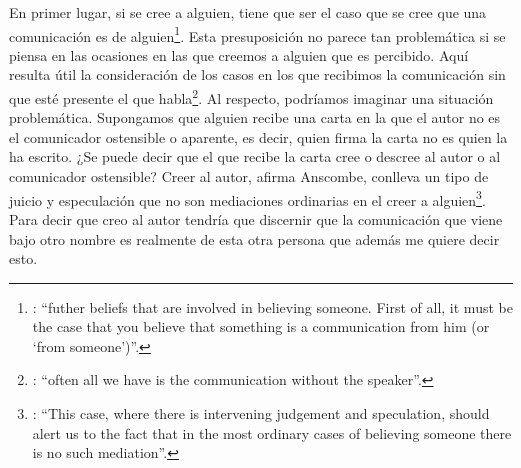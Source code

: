 En primer lugar, si se cree a alguien, tiene que ser el caso que se cree que una comunicación es de alguien\footnote{\cite[Cf.][6]{anscombe2008faith:tobelieve}: \enquote{futher beliefs that are involved in believing someone. First of all, it must be the case that you believe that something is a communication from him (or `from someone')}.}. Esta presuposición no parece tan problemática si se piensa en las ocasiones en las que creemos a alguien que es percibido. Aquí resulta útil la consideración de los casos en los que recibimos la comunicación sin que esté presente el que habla\footnote{\cite[Cf.][5]{anscombe2008faith:tobelieve}: \enquote{often all we have is the communication without the speaker}.}. Al respecto, podríamos imaginar una situación problemática. Supongamos que alguien recibe una carta en la que el autor no es el comunicador ostensible o aparente, es decir, quien firma la carta no es quien la ha escrito. ¿Se puede decir que el que recibe la carta cree o descree al autor o al comunicador ostensible? Creer al autor, afirma Anscombe, conlleva un tipo de juicio y especulación que no son mediaciones ordinarias en el creer a alguien\footnote{\cite[Cf.][7]{anscombe2008faith:tobelieve}: \enquote{This case, where there is intervening judgement and speculation, should alert us to the fact that in the most ordinary cases of believing someone there is no such mediation}.}. Para decir que creo al autor tendría que discernir que la comunicación que viene bajo otro nombre es realmente de esta otra persona que además me quiere decir esto.

